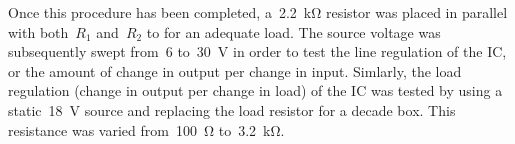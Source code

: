 Once this procedure has been completed,
a~\SI{2.2}{\kilo\ohm} resistor was placed in parallel with both~$R_1$ and~$R_2$
to for an adequate load.  The source voltage was subsequently swept from~6
to~\SI{30}{\volt} in order to test the line regulation of the IC, or the amount
of change in output per change in input.  Simlarly, the load regulation (change
in output per change in load) of the IC was tested by using a
static~\SI{18}{\volt} source and replacing the load resistor for a decade box.
This resistance was varied from~\SI{100}{\ohm} to~\SI{3.2}{\kilo\ohm}.

\begin{figure}[H]
	\centering
	
	\caption{}
	\label{fig:vrLineReg}
\end{figure}

\begin{figure}[H]
	\centering
	
	\caption{}
	\label{fig:vrLoadReg}
\end{figure}

\begin{figure}[H]
	\centering
	
\end{figure}
